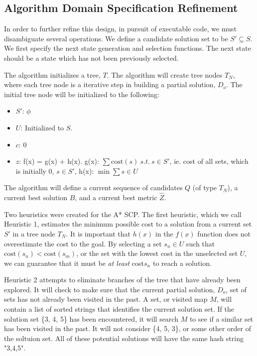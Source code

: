 \documentclass[12pt]{article}
\begin{document}
	\subsection{Algorithm Domain Specification Refinement}
	
	In order to further refine this design, in pursuit of executable code, we must disambiguate several operations. We define a candidate solution set to be $S\prime \subseteq S$. We first specify the next state generation and selection functions. The next state should be a state which has not been previously selected.
	
	The algorithm initializes a tree, $T$. The algorithm will create tree nodes $T_N$, where each tree node is a iterative step in building a partial solution, $D_o$. The initial tree node will be initialized to the following:
	\begin{itemize}
		\item $S\prime$: $\phi$
		\item $U$: Initialized to $S$.
		\item $c$: 0
		\item $z$: f(x) = g(x) + h(x). g(x): $\sum \text{cost}(s) \: s.t. \: s \in S\prime$, ie. cost of all sets, which is initially 0, $s \in S\prime$, h(x): $\min \sum s \in U$
	\end{itemize}
	The algorithm will define a current sequence of candidates $Q$ (of type $T_N$), a current best solution $\hat{B}$, and a current best metric $\hat{Z}$.
	
	Two heuristics were created for the A* SCP. The first heuristic, which we call Heuristic 1, estimates the minimum possible cost to a solution from a current set $S\prime$ in a tree node $T_N$. It is important that $h(x)$ in the $f(x)$ function does not overestimate the cost to the goal. By selecting a set $s_n \in U$ such that $\text{cost}(s_n) < \text{cost}(s_m)$, or the set with the lowest cost in the unselected set $U$, we can guarantee that it must be \textit{at least} cost${s_n}$ to reach a solution.
	
	Heuristic 2 attempts to eliminate branches of the tree that have already been explored. It will check to make sure that the current partial solution, $D_o$, set of sets has not already been visited in the past. A set, or visited map $M$, will contain a list of sorted strings that identifies the current solution set. If the solution set \{3, 4, 5\} has been encountered, it will search $M$ to see if a similar set has been visited in the past. It will not consider \{4, 5, 3\}, or some other order of the soltuion set. All of these potential solutions will have the same hash string "3,4,5".
	
\end{document}
